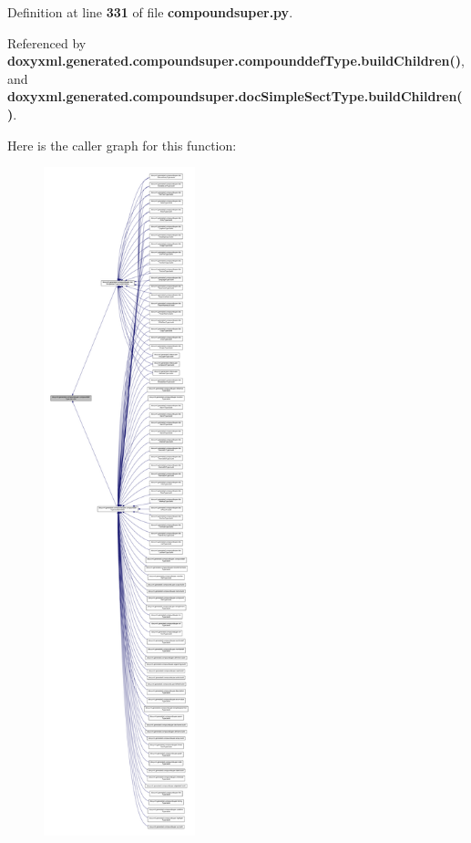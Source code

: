Definition at line {\bf 331} of file {\bf compoundsuper.\+py}.



Referenced by {\bf doxyxml.\+generated.\+compoundsuper.\+compounddef\+Type.\+build\+Children()}, and {\bf doxyxml.\+generated.\+compoundsuper.\+doc\+Simple\+Sect\+Type.\+build\+Children()}.



Here is the caller graph for this function\+:
\nopagebreak
\begin{figure}[H]
\begin{center}
\leavevmode
\includegraphics[height=550pt]{dc/d6a/classdoxyxml_1_1generated_1_1compoundsuper_1_1compounddefType_a2e1e375409772fb15646e358da41a6b3_icgraph}
\end{center}
\end{figure}




